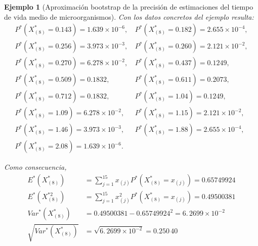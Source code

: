 \documentclass[
]{book}
\theoremstyle{break}
\newtheorem{example}{Ejemplo}[chapter]
\theoremstyle{nonumberplain}
\begin{document}
\begin{example}[Aproximación bootstrap de la precisión de estimaciones del tiempo de vida medio de microorganismos]
Con los datos concretos del ejemplo resulta:
\[\begin{array}{ll}
P^{\ast}\left( X_{\left( 8 \right)}^{\ast} = 0.143 \right) = 1.639\times 10^{-6}\text{, } 
& P^{\ast}\left( X_{\left( 8 \right)}^{\ast} = 0.182 \right) = 2.655\times 10^{-4},\\
P^{\ast}\left( X_{\left( 8 \right)}^{\ast} = 0.256 \right) = 3.973\times 10^{-3}\text{, } 
& P^{\ast}\left( X_{\left( 8 \right)}^{\ast} = 0.260 \right) = 2.121\times 10^{-2}, \\
P^{\ast}\left( X_{\left( 8 \right)}^{\ast} = 0.270 \right) = 6.278\times 10^{-2}\text{, }
& P^{\ast}\left( X_{\left( 8 \right)}^{\ast} = 0.437 \right) = 0.1249, \\
P^{\ast}\left( X_{\left( 8 \right)}^{\ast} = 0.509 \right) = 0.1832\text{, }
& P^{\ast}\left( X_{\left( 8 \right)}^{\ast} = 0.611 \right) = 0.2073,\\
P^{\ast}\left( X_{\left( 8 \right)}^{\ast} = 0.712 \right) = 0.1832\text{, }
& P^{\ast}\left( X_{\left( 8 \right)}^{\ast} = 1.04 \right) = 0.1249,\\
P^{\ast}\left( X_{\left( 8 \right)}^{\ast} = 1.09 \right) = 6.278\times 10^{-2}\text{, }
& P^{\ast}\left( X_{\left( 8 \right)}^{\ast} = 1.15 \right) = 2.121\times 10^{-2}, \\
P^{\ast}\left( X_{\left( 8 \right)}^{\ast} = 1.46 \right) = 3.973\times 10^{-3}\text{, }
& P^{\ast}\left( X_{\left( 8 \right)}^{\ast} = 1.88 \right) = 2.655\times 10^{-4}, \\
P^{\ast}\left( X_{\left( 8 \right)}^{\ast} = 2.08 \right) = 1.639\times 10^{-6}. 
\end{array}\]

Como consecuencia,
\[\begin{aligned}
E^{\ast}\left( X_{\left( 8 \right)}^{\ast} \right)
&= \sum_{j=1}^{15}x_{(j)}P^{\ast}\left( X_{\left( 8 \right)
}^{\ast}=x_{(j)} \right) =0.65749924 \\
E^{\ast}\left( X_{\left( 8 \right)}^{\ast 2} \right)
&= \sum_{j=1}^{15}x_{(j)}^2P^{\ast}\left( X_{\left( 8 \right)
}^{\ast}=x_{(j)} \right) =0.49500381 \\
Var^{\ast}\left( X_{\left( 8 \right)}^{\ast} \right)
&= 0.49500381-0.65749924^2=6.\, 2699\times 10^{-2} \\
\sqrt{Var^{\ast}\left( X_{\left( 8 \right)}^{\ast} \right)} &= \sqrt{
6.\, 2699\times 10^{-2}}=0.250\,40
\end{aligned}\]


\end{example}
\end{document}
